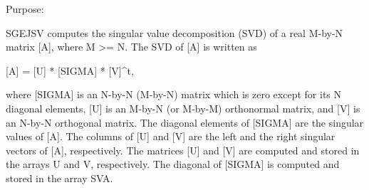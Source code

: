  \begin{DoxyParagraph}{Purpose\+: }
\begin{DoxyVerb} SGEJSV computes the singular value decomposition (SVD) of a real M-by-N
 matrix [A], where M >= N. The SVD of [A] is written as

              [A] = [U] * [SIGMA] * [V]^t,

 where [SIGMA] is an N-by-N (M-by-N) matrix which is zero except for its N
 diagonal elements, [U] is an M-by-N (or M-by-M) orthonormal matrix, and
 [V] is an N-by-N orthogonal matrix. The diagonal elements of [SIGMA] are
 the singular values of [A]. The columns of [U] and [V] are the left and
 the right singular vectors of [A], respectively. The matrices [U] and [V]
 are computed and stored in the arrays U and V, respectively. The diagonal
 of [SIGMA] is computed and stored in the array SVA.\end{DoxyVerb}
 
\end{DoxyParagraph}

